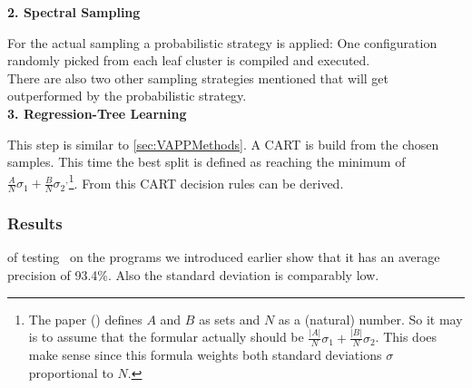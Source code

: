 \textbf{2. Spectral Sampling}

For the actual sampling a probabilistic strategy is applied: One configuration randomly picked from each leaf cluster is compiled and executed.\\
There are also two other sampling strategies mentioned that will get outperformed by the probabilistic strategy.\\

\textbf{3. Regression-Tree Learning}

This step is similar to \cref{sec:VAPPMethods}. A CART is build from the chosen samples. This time the best split is defined as reaching the minimum of $\frac{A}{N}\sigma_1+\frac{B}{N}\sigma_2$$^,$\footnote{The paper (\cite{FasterDiscoveryofFasterSystemConfigurationsSiegmund2017}) defines $A$ and $B$ as sets and $N$ as a (natural) number. So it may is to assume that the formular actually should be $\frac{|A|}{N}\sigma_1+\frac{|B|}{N}\sigma_2$. This does make sense since this formula weights both standard deviations $\sigma$ proportional to $N$.}. From this CART decision rules can be derived.

\subsubsection{Results} of testing \WHAT~on the programs we introduced earlier show that it has an average precision of 93.4\%. Also the standard deviation is comparably low.\cite{FasterDiscoveryofFasterSystemConfigurationsSiegmund2017}